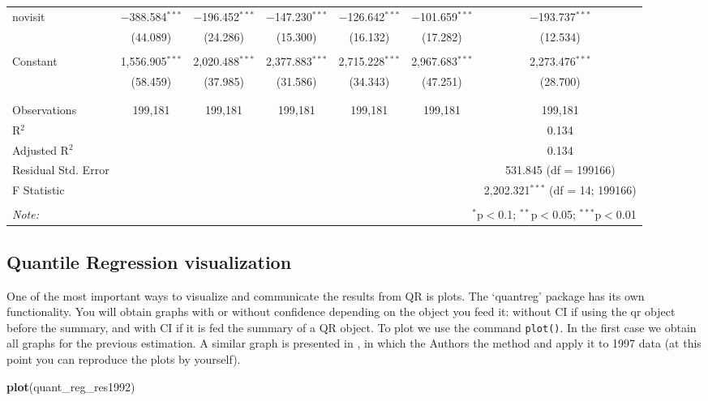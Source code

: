 \documentclass[]{book}
\newenvironment{Shaded}{\begin{snugshade}}{\end{snugshade}}
\newcommand{\KeywordTok}[1]{\textcolor[rgb]{0.13,0.29,0.53}{\textbf{#1}}}
\newcommand{\NormalTok}[1]{#1}
\begin{document}
\begin{table}[!htbp]
\begin{tabular}{@{\extracolsep{5pt}}lcccccc}
 novisit & $-$388.584$^{***}$ & $-$196.452$^{***}$ & $-$147.230$^{***}$ & $-$126.642$^{***}$ & $-$101.659$^{***}$ & $-$193.737$^{***}$ \\ 
  & (44.089) & (24.286) & (15.300) & (16.132) & (17.282) & (12.534) \\ 
  & & & & & & \\ 
 Constant & 1,556.905$^{***}$ & 2,020.488$^{***}$ & 2,377.883$^{***}$ & 2,715.228$^{***}$ & 2,967.683$^{***}$ & 2,273.476$^{***}$ \\ 
  & (58.459) & (37.985) & (31.586) & (34.343) & (47.251) & (28.700) \\ 
  & & & & & & \\ 
\hline \\[-1.8ex] 
Observations & 199,181 & 199,181 & 199,181 & 199,181 & 199,181 & 199,181 \\ 
R$^{2}$ &  &  &  &  &  & 0.134 \\ 
Adjusted R$^{2}$ &  &  &  &  &  & 0.134 \\ 
Residual Std. Error &  &  &  &  &  & 531.845 (df = 199166) \\ 
F Statistic &  &  &  &  &  & 2,202.321$^{***}$ (df = 14; 199166) \\ 
\hline 
\hline \\[-1.8ex] 
\textit{Note:}  & \multicolumn{6}{r}{$^{*}$p$<$0.1; $^{**}$p$<$0.05; $^{***}$p$<$0.01} \\ 
\end{tabular} 
\end{table}

\subsection{Quantile Regression
visualization}\label{quantile-regression-visualization}

One of the most important ways to visualize and communicate the results
from QR is plots. The `quantreg' package has its own functionality. You
will obtain graphs with or without confidence depending on the object
you feed it: without CI if using the qr object before the summary, and
with CI if it is fed the summary of a QR object. To plot we use the
command \texttt{plot()}. In the first case we obtain all graphs for the
previous estimation. A similar graph is presented in
\citep{koenker2001quantile}, in which the Authors the method and apply
it to 1997 data (at this point you can reproduce the plots by yourself).

\begin{Shaded}
\begin{Highlighting}[]
\KeywordTok{plot}\NormalTok{(quant_reg_res1992)}
\end{Highlighting}
\end{Shaded}
\end{document}
